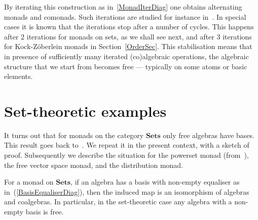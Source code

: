 \documentclass{LMCS}
\newcommand{\Cat}[1]{\ensuremath{\mathbf{#1}}}
\newcommand{\Sets}{\Cat{Sets}\xspace}
\begin{document}
By iterating this construction as in~\eqref{MonadIterDiag} one obtains
alternating monads and comonads. Such iterations are studied for
instance in~\cite{Barr69,RoseburghW91,Jacobs94b,Kock95}. In special
cases it is known that the iterations stop after a number of
cycles. This happens after 2 iterations for monads on sets, as we
shall see next, and after 3 iterations for Kock-Z{\"o}berlein monads
in Section~\ref{OrderSec}. This stabilisation means that in presence
of sufficiently many iterated (co)algebraic operations, the algebraic
structure that we start from becomes free --- typically on some atoms
or basic elements.



\section{Set-theoretic examples}\label{SetSec}


It turns out that for monads on the category \Sets only free algebras
have bases. This result goes back to~\cite{Barr69}. We repeat it in
the present context, with a sketch of proof.  Subsequently we describe
the situation for the powerset monad (from~\cite{Jacobs94b}), the
free vector space monad, and the distribution monad.


\begin{prop}
\label{SetsBasisProp}
For a monad  on \Sets, if an algebra
 has a basis
 with non-empty
equaliser  as
in~(\ref{BasisEqualiserDiag}), then the induced map  is an isomorphism of algebras and coalgebras. In
particular, in the set-theoretic case any algebra with a non-empty
basis is free.
\end{prop}
\end{document}
